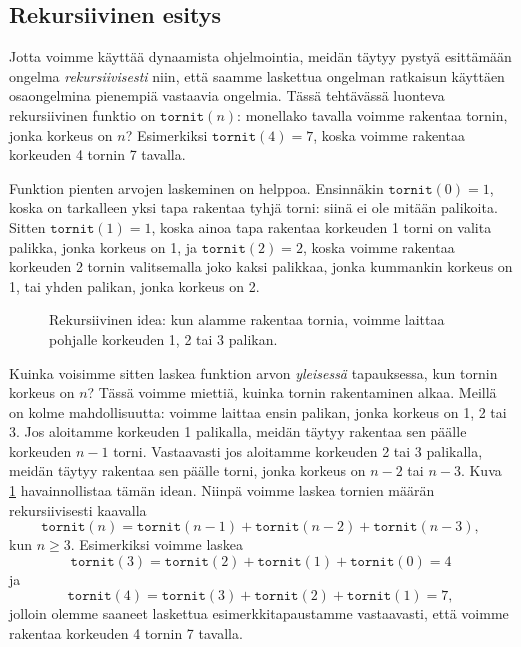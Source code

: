\subsection{Rekursiivinen esitys}

Jotta voimme käyttää dynaamista ohjelmointia,
meidän täytyy pystyä esit\-tämään ongelma \emph{rekursiivisesti}
niin, että saamme laskettua ongelman ratkaisun
käyttäen osaongelmina pienempiä vastaavia ongelmia.
Tässä tehtävässä luonteva rekursiivinen funktio on
$\texttt{tornit}(n)$: monellako tavalla voimme
rakentaa tornin, jonka korkeus on $n$?
Esimerkiksi $\texttt{tornit}(4)=7$, koska
voimme rakentaa korkeuden 4 tornin 7 tavalla.

Funktion pienten arvojen laskeminen on helppoa.
Ensinnäkin $\texttt{tornit}(0)=1$, koska on
tarkalleen yksi tapa rakentaa tyhjä torni:
siinä ei ole mitään palikoita.
Sitten $\texttt{tornit}(1)=1$, koska ainoa tapa
rakentaa korkeuden 1 torni on valita palikka, jonka korkeus on 1,
ja $\texttt{tornit}(2)=2$, koska voimme
rakentaa korkeuden 2 tornin valitsemalla joko
kaksi palikkaa, jonka kummankin korkeus on 1,
tai yhden palikan, jonka korkeus on 2.

\begin{figure}
\center
{}
\caption{Rekursiivinen idea: kun alamme rakentaa tornia, voimme laittaa pohjalle
korkeuden 1, 2 tai 3 palikan.}
\label{fig:dynrek}
\end{figure}

Kuinka voisimme sitten laskea funktion arvon \emph{yleisessä} tapauksessa,
kun tornin korkeus on $n$?
Tässä voimme miettiä, kuinka tornin rakentaminen alkaa.
Meillä on kolme mahdollisuutta: voimme laittaa ensin palikan,
jonka korkeus on 1, 2 tai 3.
Jos aloitamme korkeuden 1 palikalla, meidän täytyy rakentaa
sen päälle korkeuden $n-1$ torni.
Vastaavasti jos aloitamme korkeuden 2 tai 3 palikalla,
meidän täytyy rakentaa sen päälle torni,
jonka korkeus on $n-2$ tai $n-3$.
Kuva \ref{fig:dynrek} havainnollistaa tämän idean.
Niinpä voimme laskea tornien määrän rekursiivisesti kaavalla
\[
\texttt{tornit}(n) = \texttt{tornit}(n-1)+\texttt{tornit}(n-2)+\texttt{tornit}(n-3),
\]
kun $n \ge 3$.
Esimerkiksi voimme laskea
\[
\texttt{tornit}(3) = \texttt{tornit}(2)+\texttt{tornit}(1)+\texttt{tornit}(0)=4
\]
ja
\[
\texttt{tornit}(4) = \texttt{tornit}(3)+\texttt{tornit}(2)+\texttt{tornit}(1)=7,
\]
jolloin olemme saaneet laskettua esimerkkitapaustamme vastaavasti,
että voimme rakentaa korkeuden 4 tornin 7 tavalla.

